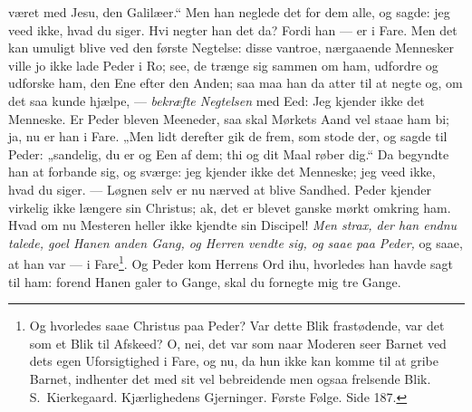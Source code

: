 \documentclass[12pt,a4paper]{book}
\begin{document}
været med Jesu, den Galilæer.“ {\large Men han neglede det for dem alle, og sagde: jeg
veed ikke, hvad du siger.} Hvi negter han det da? Fordi han --- er i Fare. Men det kan
umuligt blive ved den første Negtelse: disse vantroe, nærgaaende Mennesker ville jo ikke
lade Peder i Ro; see, de trænge sig sammen om ham, udfordre og udforske ham, den Ene efter
den Anden; saa maa han da atter til at negte og, om det saa kunde hjælpe, ---
\emph{bekræfte Negtelsen} med Eed: {\large Jeg kjender ikke det Menneske.} Er Peder
bleven Meeneder, saa skal Mørkets Aand vel staae ham bi; ja, nu er han i Fare.
„Men lidt derefter gik de frem, som stode der, og sagde til Peder: „sandelig, du er og Een
af dem; thi og dit Maal røber dig.“ {\large Da begyndte han at forbande sig, og sværge:
jeg kjender ikke det Menneske; jeg veed ikke, hvad du siger.} --- Løgnen selv er nu nærved
at blive Sandhed. Peder kjender virkelig ikke længere sin Christus; ak, det er blevet
ganske mørkt omkring ham. Hvad om nu Mesteren heller ikke kjendte sin Discipel!
\emph{Men strax, der han endnu talede, goel Hanen anden Gang, og Herren vendte sig, og
saae paa Peder,} og saae, at han var --- i Fare\footnote{%
Og hvorledes saae Christus paa Peder? Var dette Blik frastødende, var det som et Blik til
Afskeed? O, nei, det var som naar Moderen seer Barnet ved dets egen Uforsigtighed i Fare,
og nu, da hun ikke kan komme til at gribe Barnet, indhenter det med sit vel bebreidende
men ogsaa frelsende Blik. S.\ Kierkegaard. Kjærlighedens Gjerninger. Første Følge.
Side 187.}. {\large Og Peder kom Herrens Ord
ihu, hvorledes han havde sagt til ham: forend Hanen galer to Gange, skal du fornegte mig
tre Gange.}
\end{document}
